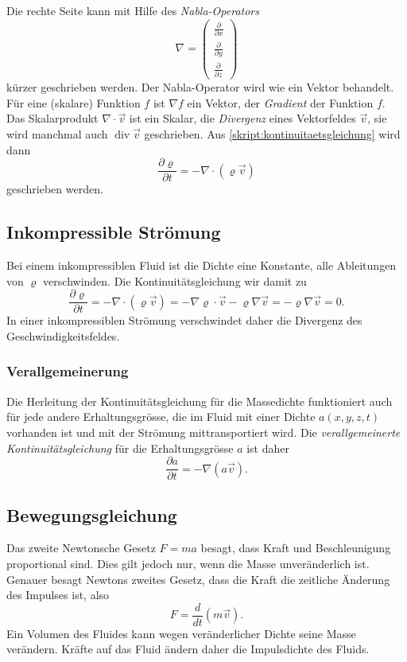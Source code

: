 %
Die rechte Seite kann mit Hilfe des {\em Nabla-Operators}
\[
\nabla
=
\begin{pmatrix}
\frac{\partial}{\partial x}\\
\frac{\partial}{\partial y}\\
\frac{\partial}{\partial z}
\end{pmatrix}
\]
kürzer geschrieben werden.
Der Nabla-Operator wird wie ein Vektor behandelt.
Für eine (skalare) Funktion $f$ ist $\nabla f$ ein Vektor,
der {\em Gradient}
 der Funktion $f$.
Das Skalarprodukt $\nabla\cdot\vec{v}$ ist ein Skalar, die
{\em Divergenz}
eines Vektorfeldes $\vec{v}$, sie wird manchmal auch 
$\operatorname{div}\vec{v}$ geschrieben.
Aus 
\eqref{skript:kontinuitaetsgleichung}
wird dann
\[
\frac{\partial \varrho}{\partial t}
=
-\nabla\cdot (\varrho\vec{v})
\]
geschrieben werden.

\subsection{Inkompressible Strömung}
Bei einem inkompressiblen Fluid ist die Dichte eine Konstante, alle
Ableitungen von $\varrho$ verschwinden.
Die Kontinuitätsgleichung wir damit zu
\[
\frac{\partial\varrho}{\partial t}
=
-\nabla\cdot(\varrho\vec{v})
=
-\nabla\varrho\cdot\vec{v}
-\varrho\nabla\vec{v}
=
-\varrho\nabla\vec{v}
=
0.
\]
In einer inkompressiblen Strömung verschwindet daher die Divergenz
des Geschwindigkeitsfeldes.

\subsubsection{Verallgemeinerung}
Die Herleitung der Kontinuitätsgleichung für die Massedichte funktioniert
auch für jede andere Erhaltungsgrösse, die im Fluid mit einer Dichte
$a(x,y,z,t)$ vorhanden ist und mit der Strömung mittransportiert wird.
Die {\em verallgemeinerte Kontinuitätsgleichung} für die Erhaltungsgrösse $a$
ist daher
\begin{equation}
\frac{\partial a}{\partial t}
=
-
\nabla(a\vec{v}).
\label{skript:verallgemeinerte kontinuitaetsgleichung}
\end{equation}

\subsection{Bewegungsgleichung}
Das zweite Newtonsche Gesetz $F=ma$ besagt, dass Kraft und Beschleunigung
proportional sind.
Dies gilt jedoch nur, wenn die Masse unveränderlich ist.
Genauer besagt Newtons zweites Gesetz, dass die Kraft die
zeitliche Änderung des Impulses ist, also
\[
F=
\frac{d}{dt}(m\vec v).
\]
Ein Volumen des Fluides kann wegen veränderlicher Dichte seine
Masse verändern.
Kräfte auf das Fluid ändern daher die Impulsdichte des Fluids.

